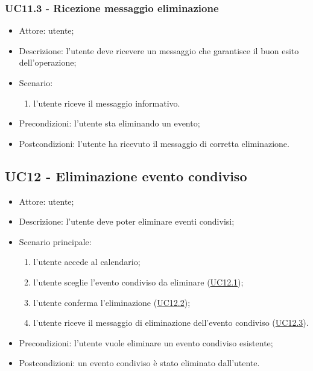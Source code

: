 \subsubsection{UC11.3 - Ricezione messaggio eliminazione} \label{sec: UC11.3}
\begin{itemize}
    \item Attore: utente;
    \item Descrizione: l'utente deve ricevere un messaggio che garantisce il buon esito dell'operazione;
    \item Scenario:
        \begin{enumerate}
        \item l'utente riceve il messaggio informativo.
        \end{enumerate}
    
    \item Precondizioni: l'utente sta eliminando un evento;
    \item Postcondizioni: l'utente ha ricevuto il messaggio di corretta eliminazione.
\end{itemize}


\subsection{UC12 - Eliminazione evento condiviso}
\begin{itemize}
    \item Attore: utente;
    \item Descrizione: l'utente deve poter eliminare eventi condivisi;
    \item Scenario principale:
        \begin{enumerate}
        \item l'utente accede al calendario;
        \item l'utente sceglie l'evento condiviso da eliminare (\hyperref[sec: UC12.1]{UC12.1});
        \item l'utente conferma l'eliminazione (\hyperref[sec: UC12.2]{UC12.2});
        \item l'utente riceve il messaggio di eliminazione dell'evento condiviso (\hyperref[sec: UC12.3]{UC12.3}).
        \end{enumerate}
    \item Precondizioni: l'utente vuole eliminare un evento condiviso esistente;
    \item Postcondizioni: un evento condiviso è stato eliminato dall'utente.
\end{itemize}

